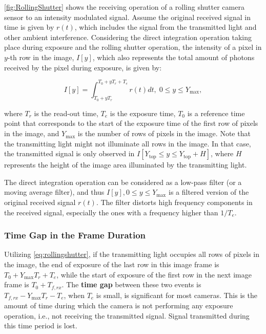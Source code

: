 \autoref{fig:RollingShutter} shows the receiving operation of a rolling shutter camera sensor to an intensity modulated signal.
Assume the original received signal in time is given by $r(t)$, which includes the signal from the transmitted light and other ambient interference. Considering the direct integration operation taking place during exposure and the rolling shutter operation, the intensity of a pixel in $y$-th row in the image, $I[y]$, which also represents the total amount of photons received by the pixel during exposure, is given by:

\begin{equation}
  I[y]=\int^{T_0+y T_r+T_e}_{T_0+y T_r} r(t) dt, \; 0 \leq y \leq Y_{\max},
  \label{eq:rollingshutter}
\end{equation}

where $T_r$ is the read-out time, $T_e$ is the exposure time, $T_0$ is a reference time point that corresponds to the start of the exposure time of the first row of pixels in the image, and $Y_{\max}$ is the number of rows of pixels in the image. Note that the transmitting light might not illuminate all rows in the image. In that case, the transmitted signal is only observed in $I[Y_{\operatorname{top}} \leq y \leq Y_{\operatorname{top}}+H]$, where $H$ represents the height of the image area illuminated by the transmitting light. 

The direct integration operation can be considered as a low-pass filter (or a moving average filter), and thus $I[y], 0 \leq y \leq Y_{\max}$ is a filtered version of the original received signal $r(t)$. The filter distorts high frequency components in the received signal, especially the ones with a frequency higher than $1/T_e$. 


\subsubsection{Time Gap in the Frame Duration}
Utilizing \autoref{eq:rollingshutter}, if the transmitting light occupies all rows of pixels in the image, the end of exposure of the last row in this image frame is $T_0 + Y_{\max} T_r + T_e$, while the start of exposure of the first row in the next image frame is $T_0 + T_{f,rx}$. The \textbf{time gap} between these two events is $T_{f,rx} - Y_{\max} T_r - T_e$, when $T_e$ is small, is significant for most cameras. 
This is the amount of time during which the camera is not performing any exposure operation, i.e., not receiving the transmitted signal. Signal transmitted during this time period is lost.  

